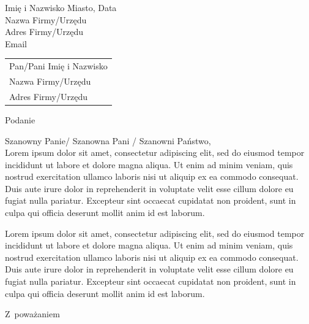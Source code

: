 \documentclass[a4paper,11pt]{article}
\begin{document}
\noindent
Imię i Nazwisko \hfill Miasto, Data\\
Nazwa Firmy/Urzędu\\
Adres Firmy/Urzędu\\
Email

\vskip 1.0cm

\phantom{a}\hfill
\begin{tabular}[c]{@{}l@{}}
Pan/Pani Imię i Nazwisko\\
Nazwa Firmy/Urzędu\\
Adres Firmy/Urzędu
\end{tabular}

\vskip 2.0cm

\begin{center}
{\Large Podanie}
\end{center}

\vskip 0.5cm

\noindent
Szanowny Panie/ Szanowna Pani / Szanowni Państwo,
\\
Lorem ipsum dolor sit amet, consectetur adipiscing elit, sed do eiusmod tempor incididunt ut labore et dolore magna aliqua. Ut enim ad minim veniam, quis nostrud exercitation ullamco laboris nisi ut aliquip ex ea commodo consequat. Duis aute irure dolor in reprehenderit in voluptate velit esse cillum dolore eu fugiat nulla pariatur. Excepteur sint occaecat cupidatat non proident, sunt in culpa qui officia deserunt mollit anim id est laborum.

Lorem ipsum dolor sit amet, consectetur adipiscing elit, sed do eiusmod tempor incididunt ut labore et dolore magna aliqua. Ut enim ad minim veniam, quis nostrud exercitation ullamco laboris nisi ut aliquip ex ea commodo consequat. Duis aute irure dolor in reprehenderit in voluptate velit esse cillum dolore eu fugiat nulla pariatur. Excepteur sint occaecat cupidatat non proident, sunt in culpa qui officia deserunt mollit anim id est laborum.

\vskip 2.0cm

\hspace{\fill} Z~poważaniem \hspace{2.0cm}
\end{document}
